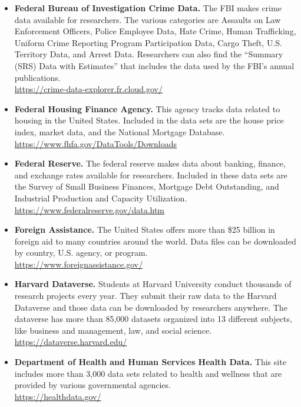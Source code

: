 \begin{itemize}
	\item \textbf{Federal Bureau of Investigation Crime Data.} The FBI makes crime data available for researchers. The various categories are Assaults on Law Enforcement Officers, Police Employee Data, Hate Crime, Human Trafficking, Uniform Crime Reporting Program Participation Data, Cargo Theft, U.S. Territory Data, and Arrest Data. Researchers can also find the ``Summary (SRS) Data with Estimates'' that includes the data used by the FBI's annual publications.
	\\ \url{https://crime-data-explorer.fr.cloud.gov/}

	\item \textbf{Federal Housing Finance Agency.} This agency tracks data related to housing in the United States. Included in the data sets are the house price index, market data, and the National Mortgage Database. 
	\\ \url{https://www.fhfa.gov/DataTools/Downloads}

	\item \textbf{Federal Reserve.} The federal reserve makes data about banking, finance, and exchange rates available for researchers. Included in these data sets are the Survey of Small Business Finances, Mortgage Debt Outstanding, and Industrial Production and Capacity Utilization.  
	\\ \url{https://www.federalreserve.gov/data.htm}

	\item \textbf{Foreign Assistance.} The United States offers more than \$25 billion in foreign aid to many countries around the world. Data files can be downloaded by country, U.S. agency, or program. 
	\\ \url{https://www.foreignassistance.gov/}

	\item \textbf{Harvard Dataverse.} Students at Harvard University conduct thousands of research projects every year. They submit their raw data to the Harvard Dataverse and those data can be downloaded by researchers anywhere. The dataverse has more than 85,000 datasets organized into 13 different subjects, like business and management, law, and social science.  
	\\ \url{https://dataverse.harvard.edu/}

	\item \textbf{Department of Health and Human Services Health Data.} This site includes more than 3,000 data sets related to health and wellness that are provided by various governmental agencies.
	\\ \url{https://healthdata.gov/}


\end{itemize}
